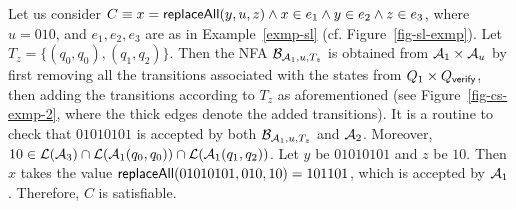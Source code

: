 \begin{example}\label{exmp-cs-case}
Let us consider $C \equiv x = \mathsf{replaceAll}(y, u, z) \wedge x \in e_1 \wedge y \in e_2 \wedge z \in e_3$, where $u = 010$, and $e_1,e_2,e_3$ are as in Example~\ref{exmp-sl} (cf. Figure~\ref{fig-sl-exmp}). 
Let $T_z = \{(q_0,q_0),(q_1,q_2)\}$. Then the NFA $\mathcal{B}_{\mathcal{A}_1, u, T_z}$ is obtained from $\mathcal{A}_1 \times \mathcal{A}_u$ by first removing all the transitions  associated with the states from $Q_1 \times Q_{\mathsf{verify}}$, then adding the transitions according to $T_z$ as aforementioned (see Figure~\ref{fig-cs-exmp-2}, where the thick edges denote the added transitions).  It is a routine to check that $01010101$ is accepted by both $\mathcal{B}_{\mathcal{A}_1, u, T_z}$ and $\mathcal{A}_2$. Moreover, $10 \in \mathcal{L}(\mathcal{A}_3) \cap \mathcal{L}(\mathcal{A}_1(q_0,q_0)) \cap \mathcal{L}(\mathcal{A}_1(q_1,q_2))$. Let $y$ be $01010101$ and $z$ be $10$. Then $x$ takes the value $\mathsf{replaceAll}(01010101, 010, 10)=101101$, which is accepted by $\mathcal{A}_1$. Therefore, $C$ is satisfiable.
%
\begin{figure}[htbp]
\begin{center}

\end{center}
\end{figure}
\end{example}
